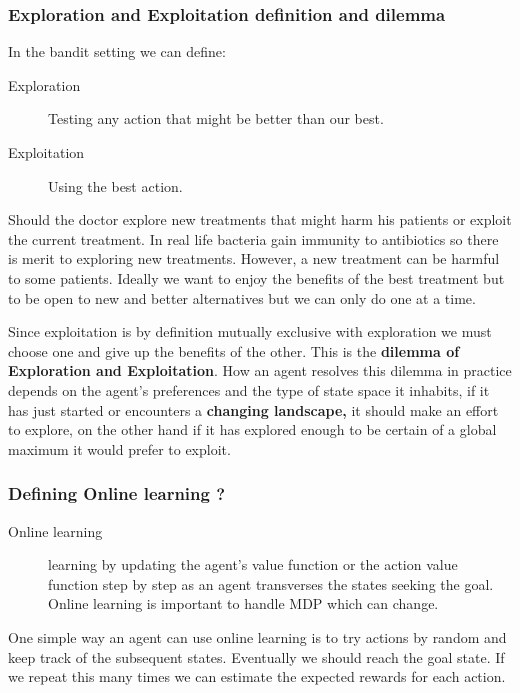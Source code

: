 \documentclass[
  letterpaper,
  DIV=11,
  numbers=noendperiod,
  oneside]{scrartcl}
\theoremstyle{definition}
\theoremstyle{remark}
\begin{document}
\subsubsection{Exploration and Exploitation definition and
dilemma}\label{L2G2}

In the bandit setting we can define:

\begin{description}
\item[Exploration]
Testing any action that might be better than our best.
\item[Exploitation]
Using the best action.
\end{description}

Should the doctor explore new treatments that might harm his patients or
exploit the current treatment. In real life bacteria gain immunity to
antibiotics so there is merit to exploring new treatments. However, a
new treatment can be harmful to some patients. Ideally we want to enjoy
the benefits of the best treatment but to be open to new and better
alternatives but we can only do one at a time.

{Since exploitation is by definition mutually exclusive with exploration
we must choose one and give up the benefits of the other. This is the
\textbf{dilemma of Exploration and Exploitation}.} How an agent resolves
this dilemma in practice depends on the agent's preferences and the type
of state space it inhabits, if it has just started or encounters a
\textbf{changing landscape,} it should make an effort to explore, on the
other hand if it has explored enough to be certain of a global maximum
it would prefer to exploit.

\subsubsection{Defining Online learning ?}\label{L2G4}

\begin{description}
\item[Online learning]
learning by updating the agent's value function or the action value
function step by step as an agent transverses the states seeking the
goal. Online learning is important to handle MDP which can change.
\end{description}

One simple way an agent can use online learning is to try actions by
random and keep track of the subsequent states. Eventually we should
reach the goal state. If we repeat this many times we can estimate the
expected rewards for each action.
\end{document}

